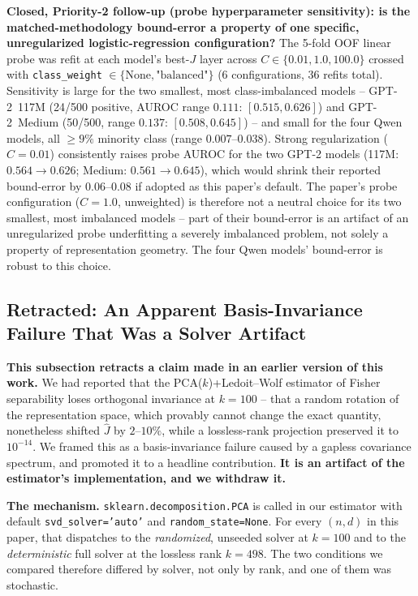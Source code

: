 \documentclass[onecolumn]{jmlr}
\begin{document}
\textbf{Closed, Priority-2 follow-up (probe hyperparameter
sensitivity): is the matched-methodology bound-error a property of one
specific, unregularized logistic-regression configuration?} The 5-fold
OOF linear probe was refit at each model's best-$J$ layer across
$C\in\{0.01,1.0,100.0\}$ crossed with \texttt{class\_weight}
$\in\{\text{None},\text{"balanced"}\}$ (6 configurations, 36 refits
total). Sensitivity is large for the two smallest, most
class-imbalanced models -- GPT-2~117M (24/500 positive, AUROC range
$0.111$: $[0.515,0.626]$) and GPT-2~Medium (50/500, range $0.137$:
$[0.508,0.645]$) -- and small for the four Qwen models, all
$\geq\!9\%$ minority class (range $0.007$--$0.038$). Strong
regularization ($C{=}0.01$) consistently raises probe AUROC for the
two GPT-2 models (117M: $0.564\to0.626$; Medium: $0.561\to0.645$),
which would shrink their reported bound-error by $0.06$--$0.08$ if
adopted as this paper's default. The paper's probe configuration
($C{=}1.0$, unweighted) is therefore not a neutral choice for its two
smallest, most imbalanced models -- part of their bound-error is an
artifact of an unregularized probe underfitting a severely imbalanced
problem, not solely a property of representation geometry. The four
Qwen models' bound-error is robust to this choice.

\subsection{Retracted: An Apparent Basis-Invariance Failure That Was a Solver Artifact}
\label{sec:invariance}

\textbf{This subsection retracts a claim made in an earlier version of this
work.} We had reported that the PCA($k$)+Ledoit--Wolf estimator of Fisher
separability loses orthogonal invariance at $k{=}100$ -- that a random rotation
of the representation space, which provably cannot change the exact quantity,
nonetheless shifted $\hat J$ by $2$--$10\%$, while a lossless-rank projection
preserved it to $10^{-14}$. We framed this as a basis-invariance failure caused
by a gapless covariance spectrum, and promoted it to a headline contribution.
\textbf{It is an artifact of the estimator's implementation, and we withdraw
it.}

\textbf{The mechanism.} \texttt{sklearn.decomposition.PCA} is called in our
estimator with default \texttt{svd\_solver='auto'} and
\texttt{random\_state=None}. For every $(n,d)$ in this paper, that dispatches
to the \emph{randomized}, unseeded solver at $k{=}100$ and to the
\emph{deterministic} full solver at the lossless rank $k{=}498$. The two
conditions we compared therefore differed by solver, not only by rank, and one
of them was stochastic.
\end{document}
